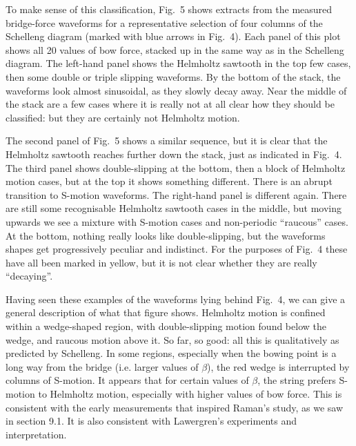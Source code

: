   To make sense of this classification, Fig.\ 5 shows extracts from the 
  measured bridge-force waveforms for a representative selection of four 
  columns of the Schelleng diagram (marked with blue arrows in Fig.\ 4). Each 
  panel of this plot shows all 20 values of bow force, stacked up in the same 
  way as in the Schelleng diagram. The left-hand panel shows the Helmholtz 
  sawtooth in the top few cases, then some double or triple slipping waveforms. 
  By the bottom of the stack, the waveforms look almost sinusoidal, as they 
  slowly decay away. Near the middle of the stack are a few cases where it is 
  really not at all clear how they should be classified: but they are certainly 
  not Helmholtz motion. 


  The second panel of Fig.\ 5 shows a similar sequence, but it is clear that 
  the Helmholtz sawtooth reaches further down the stack, just as indicated in 
  Fig.\ 4. The third panel shows double-slipping at the bottom, then a block of 
  Helmholtz motion cases, but at the top it shows something different. There is 
  an abrupt transition to S-motion waveforms. The right-hand panel is different 
  again. There are still some recognisable Helmholtz sawtooth cases in the 
  middle, but moving upwards we see a mixture with S-motion cases and 
  non-periodic “raucous” cases. At the bottom, nothing really looks like 
  double-slipping, but the waveforms shapes get progressively peculiar and 
  indistinct. For the purposes of Fig.\ 4 these have all been marked in yellow, 
  but it is not clear whether they are really “decaying”. 

  Having seen these examples of the waveforms lying behind Fig.\ 4, we can give 
  a general description of what that figure shows. Helmholtz motion is confined 
  within a wedge-shaped region, with double-slipping motion found below the 
  wedge, and raucous motion above it. So far, so good: all this is 
  qualitatively as predicted by Schelleng. In some regions, especially when the 
  bowing point is a long way from the bridge (i.e. larger values of $\beta$), 
  the red wedge is interrupted by columns of S-motion. It appears that for 
  certain values of $\beta$, the string prefers S-motion to Helmholtz motion, 
  especially with higher values of bow force. This is consistent with the early 
  measurements that inspired Raman’s study, as we saw in section 9.1. It is 
  also consistent with Lawergren's experiments and interpretation. 

